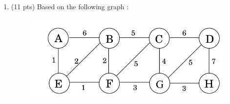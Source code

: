 \documentclass[12pt]{article}
\theoremstyle{remark}
\newtheorem*{solution}{Solution}
\begin{document}
\begin{enumerate}
\begin{enumerate}
\pagebreak
\item(5 pts) Prove the correctness of your algorithm.
\end{enumerate}
\begin{solution}
\underline{Proof:} \\ \\ 
\underline{Base Case:} Before the algorithm executes, the max edge in a given path is zero given by the line of code max(v) = 0. This means that for and path from s to some v = 0 which makes sense because no paths have been explored. Thus our base case holds. \\ \\ 
\underline{Inductive Hypothesis:} Assume that for some path $P$, at the $1,2,3, ... ,k^{th}$ iteration of the algorithm, the max(P) = max(d) \\ \\ \\
\underline{Inductive Step:} Then we can say at the $k+1^{th}$ iteration if $\exists$ $e(u,v)$ S.T. $e(u,v) > max(d)$ then the max(d) = e(u,v). The algorithm will increase the max value associated with the path at the $k+1^{th}$ iteration and this will continue until the end of the path is reached. This in turn will result in max(d) holding the max value in some P at the end of the $k+1^{th}$ iteration. \\ \\ \\
\begin{center}$\therefore$ shortestPath(G,s) stores the smallest max weight of a given path P \end{center}
\end{solution}

\pagebreak

\item (11 pts) Based on the following graph :
\begin{figure}[h!]
\begin{center}
\includegraphics[scale=0.3]{mst_graph_q2.jpg} 
\end{center}
\end{figure}


\end{enumerate}
\end{document}
